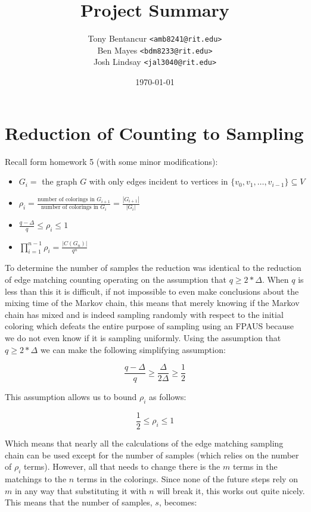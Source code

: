 \documentclass[12]{article}
\begin{document}
\title{Project Summary}
\author{Tony Bentancur \texttt{<amb8241@rit.edu>}\\ Ben Mayes \texttt{<bdm8233@rit.edu>}\\ Josh Lindsay \texttt{<jal3040@rit.edu>}}
\date{\today}
\maketitle
\section{Reduction of Counting to Sampling}
Recall form homework 5 (with some minor modifications):	
\begin{itemize}
\item $\displaystyle G_i = $ the graph $G$ with only edges incident to vertices in $\{v_0, v_1, \ldots ,v_{i-1}\} \subseteq V$
\item $\displaystyle\rho_i = \frac{\mbox{number of colorings in } G_{i+1} }{\mbox{number of colorings in } G_{i} } = \frac{|G_{i+1}|}{|G_{i}|}$
\item $\displaystyle\frac{q-\Delta}{q} \leq \rho_i \leq 1$
\item $\displaystyle\prod_{i=1}^{n-1}{\rho_i} = \frac{|C(G_n)|}{q^n}$
\end{itemize}

To determine the number of samples the reduction was identical to the reduction of edge matching counting operating on the assumption that $q \geq 2*\Delta$. When $q$ is less than this it is difficult, if not impossible to even make conclusions about the mixing time of the Markov chain, this means that merely knowing if the Markov chain has mixed and is indeed sampling randomly with respect to the initial coloring which defeats the entire purpose of sampling using an FPAUS because we do not even know if it is sampling uniformly. Using the assumption that $q \geq 2*\Delta$ we can make the following simplifying assumption:

\[ \frac{q-\Delta}{q} \geq \frac{\Delta}{2\Delta} \geq \frac{1}{2} \]

This assumption allows us to bound $\rho_i$ as follows:

\[ \frac{1}{2} \leq \rho_i \leq 1 \]

Which means that nearly all the calculations of the edge matching sampling chain can be used except for the number of samples (which relies on the number of $\rho_i$ terms). However, all that needs to change there is the $m$ terms in the matchings to the $n$ terms in the colorings. Since none of the future steps rely on $m$ in any way that substituting it with $n$ will break it, this works out quite nicely. This means that the number of samples, $s$, becomes:
\end{document}
